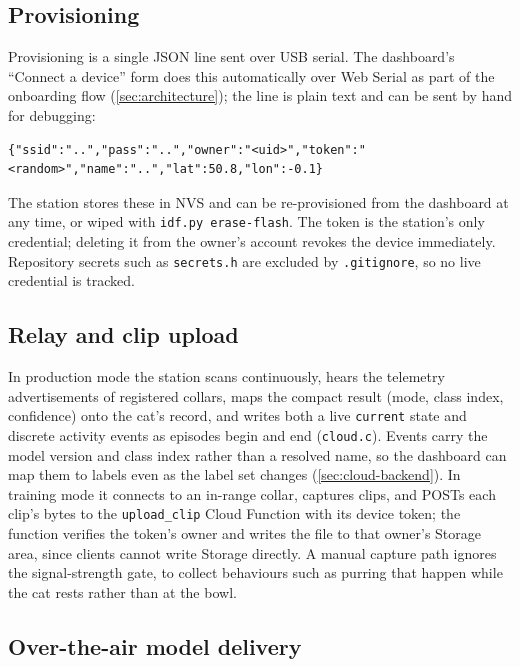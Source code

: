 \subsection{Provisioning}

Provisioning is a single JSON line sent over USB serial. The dashboard's ``Connect a device'' form
does this automatically over Web Serial as part of the onboarding flow (\cref{sec:architecture}); the
line is plain text and can be sent by hand for debugging:

\begin{lstlisting}[caption={Provisioning line (USB serial).},label={lst:provision}]
{"ssid":"..","pass":"..","owner":"<uid>","token":"<random>","name":"..","lat":50.8,"lon":-0.1}
\end{lstlisting}

The station stores these in NVS and can be re-provisioned from the dashboard at any time, or wiped
with \texttt{idf.py erase-flash}. The token is the station's only credential; deleting it from the
owner's account revokes the device immediately. Repository secrets such as \texttt{secrets.h} are
excluded by \texttt{.gitignore}, so no live credential is tracked.

\subsection{Relay and clip upload}

In production mode the station scans continuously, hears the telemetry advertisements of registered
collars, maps the compact result (mode, class index, confidence) onto the cat's record, and writes
both a live \texttt{current} state and discrete activity events as episodes begin and end
(\texttt{cloud.c}). Events carry the model version and class index rather than a resolved name, so the
dashboard can map them to labels even as the label set changes (\cref{sec:cloud-backend}). In training
mode it connects to an in-range collar, captures clips, and POSTs each clip's bytes to the
\texttt{upload\_clip} Cloud Function with its device token; the function verifies the token's owner and
writes the file to that owner's Storage area, since clients cannot write Storage directly. A manual
capture path ignores the signal-strength gate, to collect behaviours such as purring that happen while
the cat rests rather than at the bowl.

\subsection{Over-the-air model delivery}

